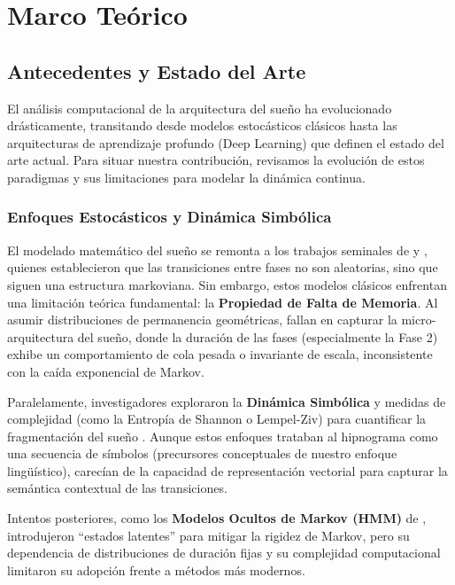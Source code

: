 \chapter{Marco Teórico}
\label{marcoteo}

\section{Antecedentes y Estado del Arte}

El análisis computacional de la arquitectura del sueño ha evolucionado drásticamente, transitando desde modelos estocásticos clásicos hasta las arquitecturas de aprendizaje profundo (Deep Learning) que definen el estado del arte actual. Para situar nuestra contribución, revisamos la evolución de estos paradigmas y sus limitaciones para modelar la dinámica continua.

\subsection{Enfoques Estocásticos y Dinámica Simbólica}
El modelado matemático del sueño se remonta a los trabajos seminales de \cite{yang1973markov} y \cite{kemp1986analysis}, quienes establecieron que las transiciones entre fases no son aleatorias, sino que siguen una estructura markoviana.
Sin embargo, estos modelos clásicos enfrentan una limitación teórica fundamental: la \textbf{Propiedad de Falta de Memoria}. Al asumir distribuciones de permanencia geométricas, fallan en capturar la micro-arquitectura del sueño, donde la duración de las fases (especialmente la Fase 2) exhibe un comportamiento de cola pesada o invariante de escala, inconsistente con la caída exponencial de Markov.

Paralelamente, investigadores exploraron la \textbf{Dinámica Simbólica} y medidas de complejidad (como la Entropía de Shannon o Lempel-Ziv) para cuantificar la fragmentación del sueño \cite{bianchi2010probabilistic}. Aunque estos enfoques trataban al hipnograma como una secuencia de símbolos (precursores conceptuales de nuestro enfoque lingüístico), carecían de la capacidad de representación vectorial para capturar la semántica contextual de las transiciones.

Intentos posteriores, como los \textbf{Modelos Ocultos de Markov (HMM)} de \cite{flexer2002continuous}, introdujeron ``estados latentes'' para mitigar la rigidez de Markov, pero su dependencia de distribuciones de duración fijas y su complejidad computacional limitaron su adopción frente a métodos más modernos.

